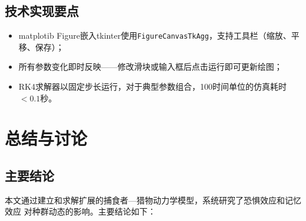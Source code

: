 \documentclass[UTF8]{ctexart}
\begin{document}
\subsection{技术实现要点}

\begin{itemize}
    \item matplotib Figure嵌入tkinter使用\texttt{FigureCanvasTkAgg}，支持工具栏（缩放、平移、保存）；
    \item 所有参数变化即时反映——修改滑块或输入框后点击运行即可更新绘图；
    \item RK4求解器以固定步长运行，对于典型参数组合，100时间单位的仿真耗时$<0.1$秒。
\end{itemize}

\section{总结与讨论}

\subsection{主要结论}

本文通过建立和求解扩展的捕食者—猎物动力学模型，系统研究了恐惧效应和记忆效应
对种群动态的影响。主要结论如下：
\end{document}
